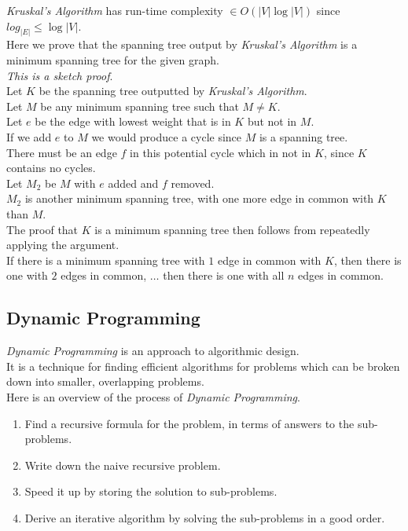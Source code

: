 \documentclass[11pt,a4paper]{article}
\begin{document}
\textit{Kruskal's Algorithm} has run-time complexity $\in O(|V|\log|V|)$ since $log_|E|\leq\log|V|$.\\

Here we prove that the spanning tree output by \textit{Kruskal's Algorithm} is a minimum spanning tree for the given graph.\\
\textit{This is a sketch proof}.\\
Let $K$ be the spanning tree outputted by \textit{Kruskal's Algorithm}.\\
Let $M$ be any minimum spanning tree such that $M\neq K$.\\
Let $e$ be the edge with lowest weight that is in $K$ but not in $M$.\\
If we add $e$ to $M$ we would produce a cycle since $M$ is a spanning tree.\\
There must be an edge $f$ in this potential cycle which in not in $K$, since $K$ contains no cycles.\\
Let $M_2$ be $M$ with $e$ added and $f$ removed.\\
$M_2$ is another minimum spanning tree, with one more edge in common with $K$ than $M$.\\
The proof that $K$ is a minimum spanning tree then follows from repeatedly applying the argument.\\
\nb If there is a minimum spanning tree with $1$ edge in common with $K$, then there is one with $2$ edges in common, $\dots$ then there is one with all $n$ edges in common.

\subsection{Dynamic Programming}

\textit{Dynamic Programming} is an approach to algorithmic design.\\
It is a technique for finding efficient algorithms for problems which can be broken down into smaller, overlapping problems.\\

Here is an overview of the process of \textit{Dynamic Programming}.
\begin{enumerate}[label=\roman*)]
  \item Find a recursive formula for the problem, in terms of answers to the sub-problems.
  \item Write down the naive recursive problem.
  \item Speed it up by storing the solution to sub-problems.
  \item Derive an iterative algorithm by solving the sub-problems in a good order.
\end{enumerate}
\end{document}
